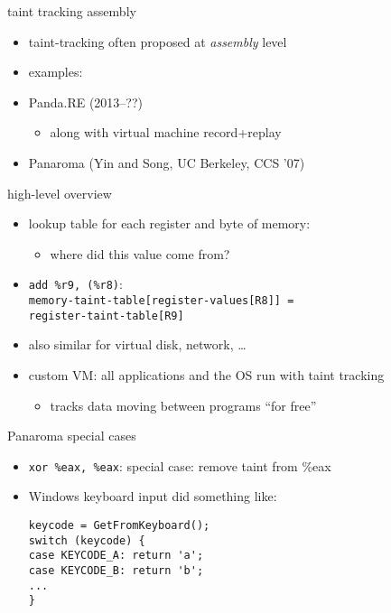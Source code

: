 \begin{frame}{taint tracking assembly}
\begin{itemize}
\item taint-tracking often proposed at \textit{assembly} level
\item examples:
\vspace{.5cm}
\item Panda.RE (2013--??)
    \begin{itemize}
    \item along with virtual machine record+replay
    \end{itemize}
\item Panaroma (Yin and Song, UC Berkeley, CCS '07)
\end{itemize}
\end{frame}

\begin{frame}{high-level overview}
\begin{itemize}
\item lookup table for each register and byte of memory:
    \begin{itemize}
    \item where did this value come from?
    \end{itemize}
\item \texttt{add \%r9, (\%r8)}: \\
    \texttt{memory-taint-table[register-values[R8]] =} \\
    \hspace{4cm} \texttt{register-taint-table[R9]}
\item also similar for virtual disk, network, \ldots
\item custom VM: all applications and the OS run with taint tracking
    \begin{itemize}
    \item tracks data moving between programs ``for free''
    \end{itemize}
\end{itemize}
\end{frame}

\begin{frame}[fragile,label=panaromaSpecial]{Panaroma special cases}
\begin{itemize}
\item \texttt{xor \%eax, \%eax}: special case: remove taint from \%eax
\item Windows keyboard input did something like:
\begin{lstlisting}
keycode = GetFromKeyboard();
switch (keycode) {
case KEYCODE_A: return 'a';
case KEYCODE_B: return 'b';
...
}
\end{lstlisting}
\end{itemize}
\end{frame}

